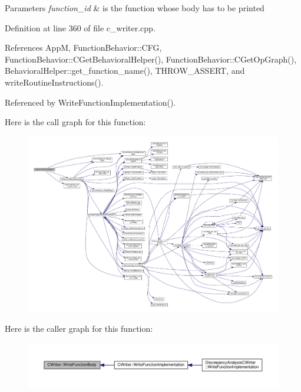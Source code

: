 \begin{DoxyParams}{Parameters}
{\em function\+\_\+id} & is the function whose body has to be printed \\
\hline
\end{DoxyParams}


Definition at line 360 of file c\+\_\+writer.\+cpp.



References AppM, Function\+Behavior\+::\+C\+FG, Function\+Behavior\+::\+C\+Get\+Behavioral\+Helper(), Function\+Behavior\+::\+C\+Get\+Op\+Graph(), Behavioral\+Helper\+::get\+\_\+function\+\_\+name(), T\+H\+R\+O\+W\+\_\+\+A\+S\+S\+E\+RT, and write\+Routine\+Instructions().



Referenced by Write\+Function\+Implementation().

Here is the call graph for this function\+:
\nopagebreak
\begin{figure}[H]
\begin{center}
\leavevmode
\includegraphics[width=350pt]{d3/d59/classCWriter_a7fa84e0feec4e832e2f2119e97cd7a3c_cgraph}
\end{center}
\end{figure}
Here is the caller graph for this function\+:
\nopagebreak
\begin{figure}[H]
\begin{center}
\leavevmode
\includegraphics[width=350pt]{d3/d59/classCWriter_a7fa84e0feec4e832e2f2119e97cd7a3c_icgraph}
\end{center}
\end{figure}
\mbox{\label{classCWriter_ad46d65f0cf64c09ce854032f15ffdd9e}} 
